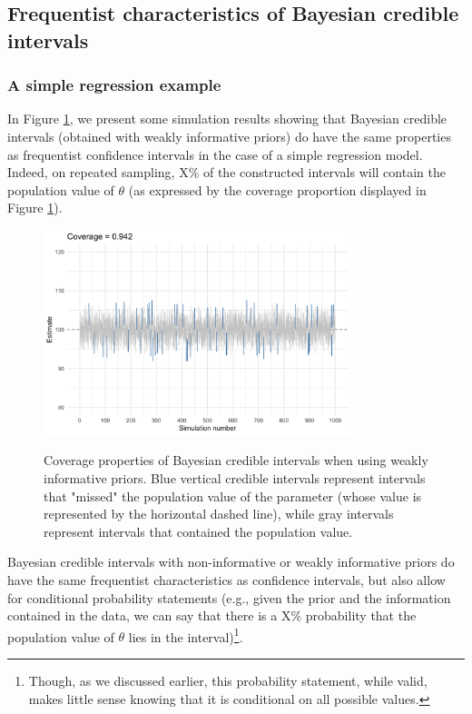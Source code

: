 \documentclass[a4paper,man,natbib,floatsintext,donotrepeattitle]{apa6}
\begin{document}
\subsection{Frequentist characteristics of Bayesian credible intervals}

\subsubsection{A simple regression example}

In Figure \ref{fig:coverage}, we present some simulation results showing that Bayesian credible intervals (obtained with weakly informative priors) do have the same properties as frequentist confidence intervals in the case of a simple regression model. Indeed, on repeated sampling, X\% of the constructed intervals will contain the population value of $\theta$ (as expressed by the coverage proportion displayed in Figure \ref{fig:coverage}).

\begin{figure}[H]
  \caption{Coverage properties of Bayesian credible intervals when using weakly informative priors. Blue vertical credible intervals represent intervals that "missed" the population value of the parameter (whose value is represented by the horizontal dashed line), while gray intervals represent intervals that contained the population value.}
  \centering
  \includegraphics[width=0.8\textwidth]{coverage1.png}
  \label{fig:coverage}
\end{figure}

Bayesian credible intervals with non-informative or weakly informative priors do have the same frequentist characteristics as confidence intervals, but also allow for conditional probability statements (e.g., given the prior and the information contained in the data, we can say that there is a X\% probability that the population value of $\theta$ lies in the interval)\footnote{Though, as we discussed earlier, this probability statement, while valid, makes little sense knowing that it is conditional on all possible values.}.
\end{document}
